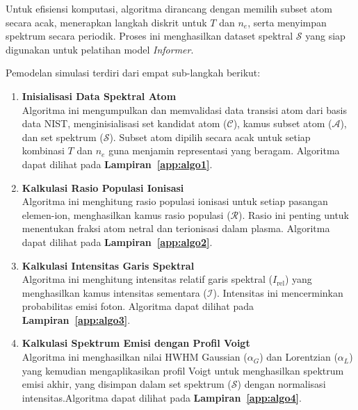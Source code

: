 \begin{enumerate}
    Untuk efisiensi komputasi, algoritma dirancang dengan memilih subset atom secara acak, menerapkan langkah diskrit untuk \(T\) dan \(n_e\), serta menyimpan spektrum secara periodik. Proses ini menghasilkan dataset spektral \(\mathcal{S}\) yang siap digunakan untuk pelatihan model \textit{Informer}.

    Pemodelan simulasi terdiri dari empat sub-langkah berikut:
    \begin{enumerate}
        \item \textbf{Inisialisasi Data Spektral Atom} \\
        Algoritma ini mengumpulkan dan memvalidasi data transisi atom dari basis data NIST, menginisialisasi set kandidat atom (\(\mathcal{C}\)), kamus subset atom (\(\mathcal{A}\)), dan set spektrum (\(\mathcal{S}\)). Subset atom dipilih secara acak untuk setiap kombinasi \(T\) dan \(n_e\) guna menjamin representasi yang beragam. Algoritma dapat dilihat pada  \textbf{Lampiran~\ref{app:algo1}}.

        \item \textbf{Kalkulasi Rasio Populasi Ionisasi} \\
        Algoritma ini menghitung rasio populasi ionisasi untuk setiap pasangan elemen-ion, menghasilkan kamus rasio populasi (\(\mathcal{R}\)). Rasio ini penting untuk menentukan fraksi atom netral dan terionisasi dalam plasma. Algoritma dapat dilihat pada \textbf{Lampiran~\ref{app:algo2}}.

        \item \textbf{Kalkulasi Intensitas Garis Spektral} \\
        Algoritma ini menghitung intensitas relatif garis spektral (\(I_{\text{rel}}\)) yang menghasilkan kamus intensitas sementara (\(\mathcal{I}\)). Intensitas ini mencerminkan probabilitas emisi foton. Algoritma dapat dilihat pada  \textbf{Lampiran~\ref{app:algo3}}.

        \item \textbf{Kalkulasi Spektrum Emisi dengan Profil Voigt} \\
        Algoritma ini menghasilkan nilai HWHM Gaussian (\(\alpha_G\)) dan Lorentzian (\(\alpha_L\)) yang kemudian mengaplikasikan profil Voigt untuk menghasilkan spektrum emisi akhir, yang disimpan dalam set spektrum (\(\mathcal{S}\)) dengan normalisasi intensitas.Algoritma dapat dilihat pada  \textbf{Lampiran~\ref{app:algo4}}.
    \end{enumerate}


\end{enumerate}
